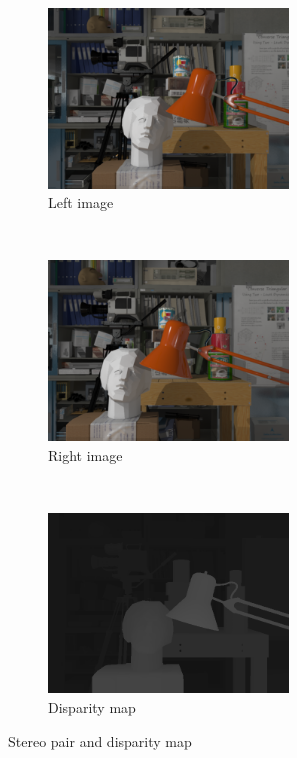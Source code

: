 \begin{figure}[h!]
\centering
\begin{subfigure}[]{0.4\textwidth}
\centering
\includegraphics[width=0.7\textwidth]{./img/left.png}
\caption{\scriptsize{Left image}}
\end{subfigure}%
~ %
\begin{subfigure}[]{0.4\textwidth}
\centering
\includegraphics[width=0.7\textwidth]{./img/right.png}
\caption{\scriptsize{Right image}}
\end{subfigure} 
~\quad
\begin{subfigure}[]{0.4\textwidth}
\centering
\includegraphics[width=0.7\textwidth]{./img/disparity.png}
\caption{\scriptsize{Disparity map}}
\label{fig:disparity}
\end{subfigure}%
\caption{\small{Stereo pair and disparity map}}
\end{figure}
